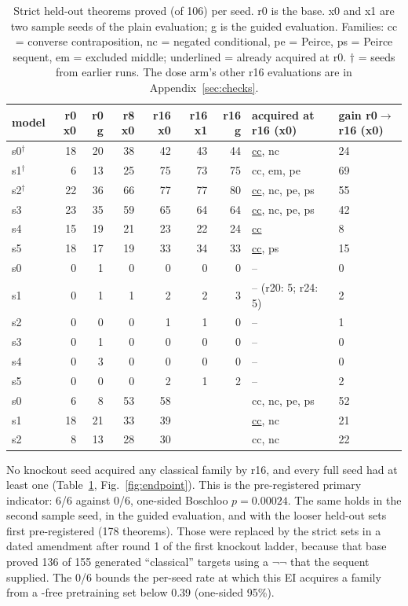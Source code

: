 \begin{table}[t]
\centering\small
\caption{Strict held-out theorems proved (of 106) per seed. r0 is the base. x0 and x1 are two sample seeds of the plain
evaluation; g is the guided evaluation. Families: cc = converse contraposition, nc = negated conditional, pe = Peirce,
ps = Peirce sequent, em = excluded middle; underlined = already acquired at r0. $\dagger$ = seeds from earlier runs. The
dose arm's other r16 evaluations are in Appendix~\ref{sec:checks}.}
\label{tab:primary}
\setlength{\tabcolsep}{4.5pt}
\begin{tabular}{lrrrrrrll}
\toprule
model & r0 x0 & r0 g & r8 x0 & r16 x0 & r16 x1 & r16 g & acquired at r16 (x0) & gain r0$\to$r16 (x0) \\
\midrule
\Kfull{} s0$^\dagger$ & 18 & 20 & 38 & 42 & 43 & 44 & \underline{cc}, nc & 24 \\
\Kfull{} s1$^\dagger$ & 6 & 13 & 25 & 75 & 73 & 75 & cc, em, pe & 69 \\
\Kfull{} s2$^\dagger$ & 22 & 36 & 66 & 77 & 77 & 80 & \underline{cc}, nc, pe, ps & 55 \\
\Kfull{} s3 & 23 & 35 & 59 & 65 & 64 & 64 & \underline{cc}, nc, pe, ps & 42 \\
\Kfull{} s4 & 15 & 19 & 21 & 23 & 22 & 24 & \underline{cc} & 8 \\
\Kfull{} s5 & 18 & 17 & 19 & 33 & 34 & 33 & \underline{cc}, ps & 15 \\
\midrule
\Kko{} s0 & 0 & 1 & 0 & 0 & 0 & 0 & -- & 0 \\
\Kko{} s1 & 0 & 1 & 1 & 2 & 2 & 3 & -- (r20: 5; r24: 5) & 2 \\
\Kko{} s2 & 0 & 0 & 0 & 1 & 1 & 0 & -- & 1 \\
\Kko{} s3 & 0 & 1 & 0 & 0 & 0 & 0 & -- & 0 \\
\Kko{} s4 & 0 & 3 & 0 & 0 & 0 & 0 & -- & 0 \\
\Kko{} s5 & 0 & 0 & 0 & 2 & 1 & 2 & -- & 2 \\
\midrule
\Kdose{} s0 & 6 & 8 & 53 & 58 & & & cc, nc, pe, ps & 52 \\
\Kdose{} s1 & 18 & 21 & 33 & 39 & & & \underline{cc}, nc & 21 \\
\Kdose{} s2 & 8 & 13 & 28 & 30 & & & cc, nc & 22 \\
\bottomrule
\end{tabular}
\end{table}

No knockout seed acquired any classical family by r16, and every full seed had at least one (Table~\ref{tab:primary},
Fig.~\ref{fig:endpoint}). This is the pre-registered primary indicator: 6/6 against 0/6, one-sided Boschloo
$p = 0.00024$. The same holds in the second sample seed, in the guided evaluation, and with the looser held-out sets
first pre-registered (178 theorems). Those were replaced by the strict sets in a dated amendment after round 1 of the
first knockout ladder, because that base proved 136 of 155 generated ``classical'' targets using a $\neg\neg$ that the
sequent supplied. The 0/6 bounds the per-seed rate at which this EI acquires a family from a \sig-free pretraining set
below 0.39 (one-sided 95\%).

